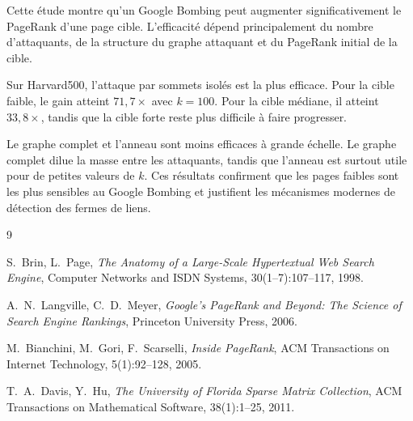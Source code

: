 \documentclass[12pt,a4paper]{article}
\theoremstyle{definition}
\begin{document}
Cette étude montre qu'un Google Bombing peut augmenter significativement le
PageRank d'une page cible. L'efficacité dépend principalement du nombre
d'attaquants, de la structure du graphe attaquant et du PageRank initial de la
cible.

Sur Harvard500, l'attaque par sommets isolés est la plus efficace. Pour la
cible faible, le gain atteint $71{,}7\times$ avec $k=100$. Pour la cible
médiane, il atteint $33{,}8\times$, tandis que la cible forte reste plus
difficile à faire progresser.

Le graphe complet et l'anneau sont moins efficaces à grande échelle. Le graphe
complet dilue la masse entre les attaquants, tandis que l'anneau est surtout
utile pour de petites valeurs de $k$. Ces résultats confirment que les pages
faibles sont les plus sensibles au Google Bombing et justifient les mécanismes
modernes de détection des fermes de liens.

\begin{thebibliography}{9}

S.~Brin, L.~Page,
\textit{The Anatomy of a Large-Scale Hypertextual Web Search Engine},
Computer Networks and ISDN Systems, 30(1--7):107--117, 1998.

A.~N.~Langville, C.~D.~Meyer,
\textit{Google's PageRank and Beyond: The Science of Search Engine Rankings},
Princeton University Press, 2006.

M.~Bianchini, M.~Gori, F.~Scarselli,
\textit{Inside PageRank},
ACM Transactions on Internet Technology, 5(1):92--128, 2005.

T.~A.~Davis, Y.~Hu,
\textit{The University of Florida Sparse Matrix Collection},
ACM Transactions on Mathematical Software, 38(1):1--25, 2011.

\end{thebibliography}
\end{document}
